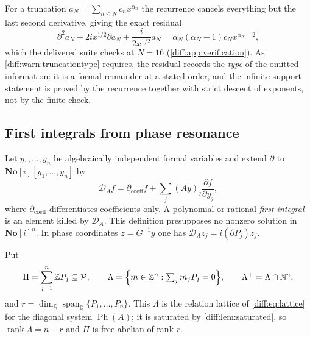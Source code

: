 \documentclass[11pt,letterpaper]{article}
\numberwithin{equation}{section}
\theoremstyle{definition}
\theoremstyle{remark}
\newcommand{\SC}{\mathbf{No}[i]}
\newcommand{\Q}{\mathbb Q}
\newcommand{\Z}{\mathbb Z}
\newcommand{\N}{\mathbb N}
\newcommand{\der}{\partial}
\newcommand{\Pcl}{\mathcal P}
\newcommand{\Span}{\operatorname{span}}
\newcommand{\Ph}{\operatorname{Ph}}
\begin{document}
For a truncation $a_{N}=\sum_{n\leq N}c_{n}x^{\alpha_{n}}$ the recurrence
cancels everything but the last second derivative, giving the exact residual
\begin{equation}\label{diff:eq:matairyres}
 \der^{2}a_{N}+2ix^{1/2}\der a_{N}+\frac{i}{2x^{1/2}}a_{N}
  =\alpha_{N}(\alpha_{N}-1)c_{N}x^{\alpha_{N}-2},
\end{equation}
which the delivered suite checks at $N=16$
(\cref{diff:app:verification}). As \cref{diff:warn:truncationtype} requires,
the residual records the \emph{type} of the omitted information: it is a formal
remainder at a stated order, and the infinite-support statement is proved by
the recurrence together with strict descent of exponents, not by the finite
check.

\subsection{First integrals from phase resonance}
\label{diff:sub:matresonance}

Let $y_{1},\dots,y_{n}$ be algebraically independent formal variables and
extend $\der$ to $\SC[y_{1},\dots,y_{n}]$ by
\[
 \mathcal D_{A}f=\der_{\mathrm{coeff}}f+\sum_{j}(Ay)_{j}\frac{\partial f}{\partial y_{j}},
\]
where $\der_{\mathrm{coeff}}$ differentiates coefficients only. A polynomial or
rational \emph{first integral} is an element killed by $\mathcal D_{A}$. This
definition presupposes no nonzero solution in $\SC^{n}$. In phase coordinates
$z=G^{-1}y$ one has $\mathcal D_{A}z_{j}=i(\der P_{j})z_{j}$.

Put
\[
 \Pi=\sum_{j=1}^{n}\Z P_{j}\subseteq\Pcl,
 \qquad
 \Lambda=\Bigl\{m\in\Z^{n}:\textstyle\sum_{j}m_{j}P_{j}=0\Bigr\},
 \qquad
 \Lambda^{+}=\Lambda\cap\N^{n},
\]
and $r=\dim_{\Q}\Span_{\Q}\{P_{1},\dots,P_{n}\}$. This $\Lambda$ is the
relation lattice of \cref{diff:eq:lattice} for the diagonal system
$\Ph(A)$; it is saturated by \cref{diff:lem:saturated}, so
$\operatorname{rank}\Lambda=n-r$ and $\Pi$ is free abelian of rank $r$.
\end{document}
